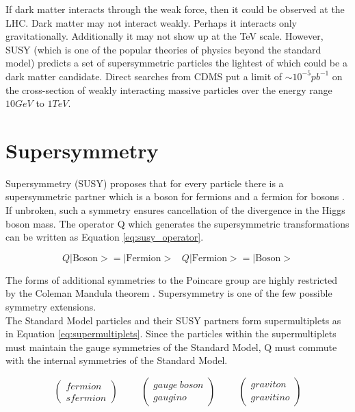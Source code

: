 If dark matter interacts through the weak force, then it could be observed at
the LHC. Dark matter may not interact weakly. Perhaps it interacts only 
gravitationally. Additionally it may not show up at the TeV scale. However, 
SUSY (which is one of the popular theories of physics beyond the standard model) 
predicts a set of supersymmetric particles the lightest of which could be a 
dark matter candidate. Direct searches from CDMS \cite{cdms} put a limit of 
$\sim 10^{-5}\unit{pb^{-1}}$ on the cross-section of weakly interacting massive 
particles over the energy range $10\unit{GeV}$ to $1\unit{TeV}$.

\section{Supersymmetry}

Supersymmetry (SUSY) proposes that for every particle there is a supersymmetric 
partner which is a boson for fermions and a fermion for bosons \cite{primer}. 
If unbroken, such a symmetry ensures cancellation of the divergence in the Higgs 
boson mass. The operator Q which generates the supersymmetric transformations 
can be written as Equation \ref{eq:susy_operator}.

\begin{equation}
Q|\mbox{Boson}> = |\mbox{Fermion}> \hspace{10pt} Q|\mbox{Fermion}> = |\mbox{Boson}>
\label{eq:susy_operator}
\end{equation}

The forms of additional symmetries to the Poincare group are highly restricted
by the Coleman Mandula theorem \cite{coleman}. Supersymmetry is one of the few
possible symmetry extensions. \\ 

The Standard Model particles and their SUSY partners form supermultiplets as in
Equation \ref{eq:supermultiplets}. Since the particles within the
supermultiplets must maintain the gauge symmetries of the Standard Model, Q must 
commute with the internal symmetries of the Standard Model.

\begin{equation}
\left(\begin{array}{c}fermion\\sfermion\end{array}\right) \hspace{1cm}
\left(\begin{array}{c}gauge\hspace{3pt}boson\\gaugino\end{array}\right) \hspace{1cm}
\left(\begin{array}{c}graviton\\gravitino\end{array}\right)
\label{eq:supermultiplets}
\end{equation}

